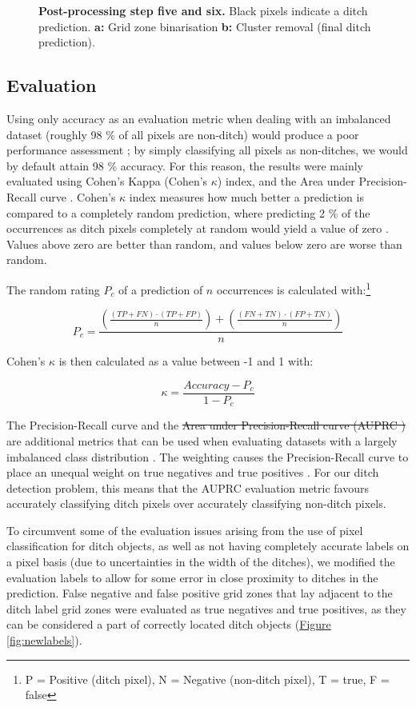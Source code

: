 \documentclass[11pt, review]{elsarticle} %
\providecommand{\DIFaddtex}[1]{{\protect\color{blue}\uwave{#1}}} %
\providecommand{\DIFdeltex}[1]{{\protect\color{red}\sout{#1}}}                      %
\providecommand{\DIFaddbegin}{} %
\providecommand{\DIFaddend}{} %
\providecommand{\DIFdelbegin}{} %
\providecommand{\DIFdelend}{} %
\providecommand{\DIFadd}[1]{\texorpdfstring{\DIFaddtex{#1}}{#1}} %
\providecommand{\DIFdel}[1]{\texorpdfstring{\DIFdeltex{#1}}{}} %
\begin{document}
\begin{figure} [!htb]
    \caption{\textbf{Post-processing step five and six.} Black pixels indicate a ditch prediction. \textbf{a: }Grid zone binarisation \textbf{b: }Cluster removal (final ditch prediction).}
    \label{fig:postprocessing3}
\end{figure}

\subsection{Evaluation} \label{evaluation}

Using only accuracy as an evaluation metric when dealing with an imbalanced dataset (roughly 98 \% of all pixels are non-ditch) would produce a poor performance assessment \citep{balanced}; by simply classifying all pixels as non-ditches, we would by default attain 98 \% accuracy. For this reason, the results were mainly evaluated using Cohen's Kappa (Cohen's $\kappa$) index, and the Area under Precision-Recall curve \DIFaddbegin \DIFadd{(AUPRC)}\DIFaddend . Cohen's $\kappa$ index measures how much better a prediction is compared to a completely random prediction, where predicting 2 \% of the occurrences as ditch pixels completely at random would yield a value of zero \citep{kappa123}. Values above zero are better than random, and values below zero are worse than random.

The random rating $P_c$ of a prediction of $n$ occurrences is calculated with:\footnote{ P = Positive (ditch pixel), N = Negative (non-ditch pixel), T = true, F = false}

$$
P_c = \frac{\left(\frac{(TP + FN) \cdot (TP + FP)}{n}\right) + \left(\frac{(FN + TN) \cdot (FP + TN)}{n}\right)}{n}
$$


Cohen's $\kappa$ is then calculated as a value between -1 and 1 with:

$$\kappa = \frac{Accuracy - P_c}{1 - P_c}$$

The Precision-Recall curve and the \DIFdelbegin \DIFdel{Area under Precision-Recall curve (AUPRC  ) }\DIFdelend \DIFaddbegin \DIFadd{AUPRC  }\DIFaddend are additional metrics that can be used when evaluating datasets with a largely imbalanced class distribution \citep{precision_recall_curve}. The weighting causes the Precision-Recall curve to place an unequal weight on true negatives and true positives \citep{precision_recall_curve}. For our ditch detection problem, this means that the AUPRC evaluation metric favours accurately classifying ditch pixels over accurately classifying non-ditch pixels.

To circumvent some of the evaluation issues arising from the use of pixel classification for ditch objects, as well as not having completely accurate labels on a pixel basis (due to uncertainties in the width of the ditches), we modified the evaluation labels to allow for some error in close proximity to ditches in the prediction. False negative and false positive grid zones that lay adjacent to the ditch label grid zones were evaluated as true negatives and true positives, as they can be considered a part of correctly located ditch objects (\hyperref[fig:newlabels]{Figure} \ref{fig:newlabels}).
\end{document}
